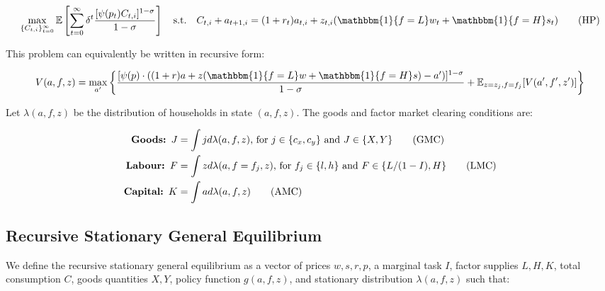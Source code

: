 \documentclass{article}
\begin{document}
\vspace{-0.2cm}
\begin{equation}
\max_{\{C_{t,i}\}_{t=0}^\infty} \mathbb{E}\left[\sum_{t=0}^\infty \delta^t\frac{[\psi (p_t)C_{t,i}]^{1-\sigma}}{1-\sigma}\right] \quad \text{s.t.} \quad C_{t,i}+a_{t+1,i}=(1+r_t) a_{t,i}+z_{t,i}(\mathbbm{1}\{f=L\} w_t+\mathbbm{1}\{f=H\}s_t) \tag{HP}
\end{equation}

This problem can equivalently be written in recursive form:

\vspace{-0.4cm}
$$
V(a,f,z)=\max_{a'}\left\{\frac{[\psi(p)\cdot((1+r)a+z(\mathbbm{1}\{f=L\} w+\mathbbm{1}\{f=H\}s)-a')]^{1-\sigma}}{1-\sigma}+\mathbb{E}_{z=z_j,f=f_j}[V(a',f',z')]\right\}
$$

Let $\lambda(a,f,z)$ be the distribution of households in state $(a,f,z)$. The goods and factor market clearing conditions are:

\vspace{-0.8cm}
\begin{align}
    \text{\textbf{Goods: }} J&=\int j d \lambda(a,f,z) \text{, for $j\in\{c_x,c_y\}$ and $J\in\{X,Y\}$} \tag{GMC} \\
    \text{\textbf{Labour: }} F&=\int z d\lambda(a,f=f_j,z) \text{, for $f_j\in\{l,h\}$ and $F\in\{L/(1-I),H\}$} \tag{LMC} \\
    \text{\textbf{Capital: }} K&=\int ad\lambda(a,f,z) \tag{AMC}
\end{align}

\subsection{Recursive Stationary General Equilibrium}

We define the recursive stationary general equilibrium as a vector of prices $w,s,r,p$, a marginal task $I$, factor supplies $L,H,K$, total consumption $C$, goods quantities $X,Y$, policy function $g(a,f,z)$, and stationary distribution $\lambda(a,f,z)$ such that:
\end{document}
